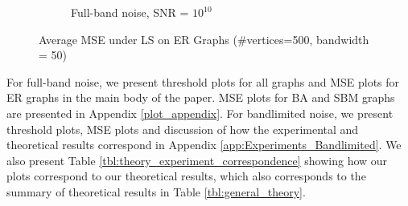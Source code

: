 \begin{figure}
\begin{subfigure}{0.3\columnwidth}
    \label{MSE_subfigb}%
    \end{subfigure}\hfill%
    \begin{subfigure}{0.3\columnwidth}
    \caption{Full-band noise, SNR = $10^{10}$}%
    \label{MSE_subfigc}%
    \end{subfigure}%
    \caption{Average MSE under LS on ER Graphs (\#vertices=500, bandwidth = 50) }
\label{LS_ER_MSE_fig}
\end{figure}





For full-band noise, we present threshold plots for all graphs and MSE plots for ER graphs in the main body of the paper. MSE plots for BA and SBM graphs are presented in Appendix \ref{plot_appendix}. For bandlimited noise, we present threshold plots, MSE plots and discussion of how the experimental and theoretical results correspond in Appendix \ref{app:Experiments_Bandlimited}.
{\color{black} We also present Table \ref{tbl:theory_experiment_correspondence} showing how our plots correspond to our theoretical results, which also corresponds to the summary of theoretical results in Table \ref{tbl:general_theory}.}

